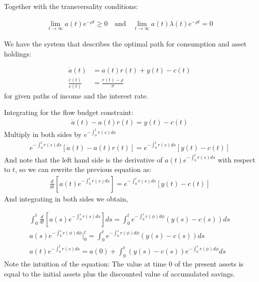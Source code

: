 \documentclass[aspectratio=169]{beamer}
\begin{document}
\begin{frame}

    Together with the transversality conditions:
    
    \begin{align}
        \lim_{t\rightarrow\infty} a(t)e^{-\rho t}\geq 0 \quad\text{and}\quad \lim_{t\rightarrow\infty} a(t)\lambda(t)e^{-\rho t}=0
    \end{align}

    We have the system that describes the optimal path for consumption and asset holdings:
    
    \begin{align*}
        \dot{a}(t)&=a(t)r(t)+y(t)-c(t)\\
        \frac{\dot{c}(t)}{c(t)}&=\frac{r(t)-\rho}{\sigma}
    \end{align*}
    for given paths of income and the interest rate.
\end{frame}

\begin{frame}
    Integrating for the flow budget constraint:
    \begin{align*}
        \dot{a}(t)-a(t)r(t)=y(t)-c(t)
    \end{align*}
    Multiply in both sides by $e^{-\int_0^t r(s)ds}$
    \begin{align*}
        e^{-\int_0^t r(s)ds}[\dot{a}(t)-a(t)r(t)]=e^{-\int_0^t r(s)ds}[y(t)-c(t)]
    \end{align*}
    And note that the left hand side is the derivative of \(a(t)e^{-\int_0^t r(s)ds}\) with respect to $t$, so we can rewrite the previous equation as:
    \begin{align*}
        \frac{d}{dt}\left[a(t)e^{-\int_0^t r(s)ds}\right]=e^{-\int_0^t r(s)ds}[y(t)-c(t)]
    \end{align*}
    And integrating in both sides we obtain,
\end{frame}

\begin{frame}
    \begin{align*}
        \int_0^t \frac{d}{dt}\left[a(s)e^{-\int_0^s r(s)ds}\right]ds = \int_0^t e^{-\int_0^s r(\phi)d\phi}(y(s)-c(s))ds\\
        a(s)e^{-\int_0^s r(\phi)d\phi}\bigg\vert_{0}^{t}=\int_0^t e^{-\int_0^s r(\phi)d\phi} (y(s)-c(s))ds\\
        a(t)e^{-\int_0^t r(s)ds}=a(0)+\int_0^t(y(s)-c(s))e^{-\int_0^s r(\phi)d\phi}ds
    \end{align*}
    Note the intuition of the equation: The value at time 0 of the present assets is equal to the initial assets plus the discounted value of accumulated savings.
\end{frame}
\end{document}
